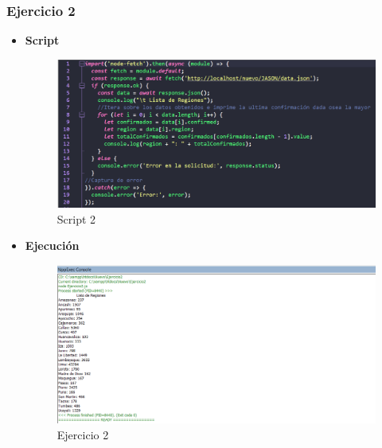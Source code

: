 \documentclass{article}
\begin{document}
    \subsubsection{Ejercicio 2}
    \begin{itemize}
    	\item \textbf{Script}
    	\begin{figure}[H]
    		\centering
    		\includegraphics[width=1\textwidth,keepaspectratio]{img/Script2.png}
    		\caption{Script 2}
    	\end{figure}
    	\newpage
    	\item \textbf{Ejecución}
    	\begin{figure}[H]
    		\centering
    		\includegraphics[width=1\textwidth,keepaspectratio]{img/Ejecucion2.png}
    		\caption{Ejercicio 2}
    	\end{figure}
    \end{itemize}
 	\newpage
\end{document}
